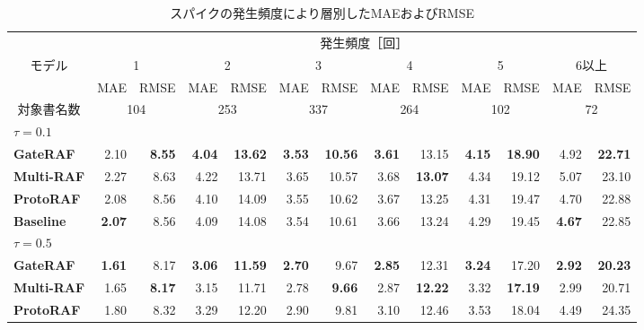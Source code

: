 \begin{table}[t]
    \revAcolor
    \caption{スパイクの発生頻度により層別したMAEおよびRMSE}
    \label{tab:spike_profile}
    \centering
    \setlength{\tabcolsep}{3pt}%
    \begin{tabular}{lrrrrrrrrrrrr}
        \hline
        & \multicolumn{12}{c}{発生頻度［回］} \\
        \cline{2-13}
        \multicolumn{1}{c}{モデル} & \multicolumn{2}{c}{1} & \multicolumn{2}{c}{2} & \multicolumn{2}{c}{3} & \multicolumn{2}{c}{4} & \multicolumn{2}{c}{5} & \multicolumn{2}{c}{6以上} \\
        \cline{2-3} \cline{4-5} \cline{6-7} \cline{8-9} \cline{10-11} \cline{12-13}
         & MAE & RMSE & MAE & RMSE & MAE & RMSE & MAE & RMSE & MAE & RMSE & MAE & RMSE \\
        \hline
        \multicolumn{1}{c}{対象書名数} & \multicolumn{2}{c}{104} & \multicolumn{2}{c}{253} & \multicolumn{2}{c}{337} & \multicolumn{2}{c}{264} & \multicolumn{2}{c}{102} & \multicolumn{2}{c}{72} \\
        \hline\hline
        \multicolumn{13}{l}{$\tau=0.1$} \\
        \quad \textbf{GateRAF} & 2.10 & \textbf{8.55} & \textbf{4.04} & \textbf{13.62} & \textbf{3.53} & \textbf{10.56} & \textbf{3.61} & 13.15 & \textbf{4.15} & \textbf{18.90} & 4.92 & \textbf{22.71} \\
        \quad \textbf{Multi-RAF} & 2.27 & 8.63 & 4.22 & 13.71 & 3.65 & 10.57 & 3.68 & \textbf{13.07} & 4.34 & 19.12 & 5.07 & 23.10 \\
        \quad \textbf{ProtoRAF} & 2.08 & 8.56 & 4.10 & 14.09 & 3.55 & 10.62 & 3.67 & 13.25 & 4.31 & 19.47 & 4.70 & 22.88 \\
        \quad \textbf{Baseline} & \textbf{2.07} & 8.56 & 4.09 & 14.08 & 3.54 & 10.61 & 3.66 & 13.24 & 4.29 & 19.45 & \textbf{4.67} & 22.85 \\
        \hline
        \multicolumn{13}{l}{$\tau=0.5$} \\
        \quad \textbf{GateRAF} & \textbf{1.61} & 8.17 & \textbf{3.06} & \textbf{11.59} & \textbf{2.70} & 9.67 & \textbf{2.85} & 12.31 & \textbf{3.24} & 17.20 & \textbf{2.92} & \textbf{20.23} \\
        \quad \textbf{Multi-RAF} & 1.65 & \textbf{8.17} & 3.15 & 11.71 & 2.78 & \textbf{9.66} & 2.87 & \textbf{12.22} & 3.32 & \textbf{17.19} & 2.99 & 20.71 \\
        \quad \textbf{ProtoRAF} & 1.80 & 8.32 & 3.29 & 12.20 & 2.90 & 9.81 & 3.10 & 12.46 & 3.53 & 18.04 & 4.49 & 24.35 \\

\end{tabular}
\end{table}
